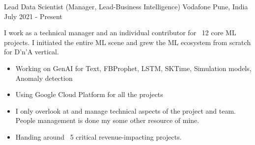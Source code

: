 \begin{cventries}

	\cventry
	{Lead Data Scientist (Manager, Lead-Business Intelligence)}
	{Vodafone}
	{Pune, India}
	{July 2021 - Present}
	{
		\begin{justify}
			I work as a technical manager and an individual contributor for ~12 core ML projects. I initiated the entire ML scene and grew the ML ecosystem from scratch for D'n'A vertical.
			\begin{itemize}
				\item Working on GenAI for Text, FBProphet, LSTM, SKTime, Simulation models, Anomaly detection 
				\item Using Google Cloud Platform for all the projects
				\item I only overlook at and manage technical aspects of the project and team. People management is done my some other resource of mine.
				\item Handing around ~5 critical revenue-impacting projects.
			\end{itemize}
		\end{justify}
	}


\end{cventries}

